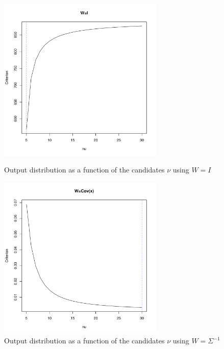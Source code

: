 \begin{figure}\label{SP500_returns_criterion}
    \centering
    \includegraphics[width=0.7\textwidth]{S&P500_returns_criterion_(W=I).pdf}
    \caption{Output distribution as a function of the candidates $\nu$ using $W=I$}
    \includegraphics[width=0.7\textwidth]{S&P500_returns_criterion_(W=Sigma^-1).pdf}
    \caption{Output distribution as a function of the candidates $\nu$ using $W=\Sigma^{-1}$}
\end{figure}

